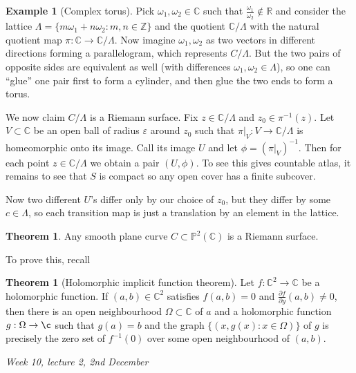 \documentclass{article}
\newcommand{\Z}{\mathbb{Z}}
\newcommand{\R}{\mathbb{R}}
\newcommand{\C}{\mathbb{C}}
\newcommand{\p}{\mathbb{P}}
\theoremstyle{definition}
\newtheorem{thm}[defn]{Theorem}
\newtheorem{example}[defn]{Example}
\begin{document}
\begin{example}[Complex torus]
Pick $\omega_1,\omega_2\in\C$ such that $\frac{\omega_1}{\omega_2}\notin\R$ and consider the lattice $\Lambda=\{m\omega_1+n\omega_2:m,n\in\Z\}$ and the quotient $\C/\Lambda$ with the natural quotient map $\pi:\C\rightarrow\C/\Lambda$. Now imagine $\omega_1,\omega_2$ as two vectors in different directions forming a parallelogram, which represents $C/\Lambda$. But the two pairs of opposite sides are equivalent as well (with differences $\omega_1,\omega_2\in\Lambda$), so one can ``glue'' one pair first to form a cylinder, and then glue the two ends to form a torus.

We now claim $C/\Lambda$ is a Riemann surface. Fix $z\in\C/\Lambda$ and $z_0\in\pi^{-1}(z)$. Let $V\subset\C$ be an open ball of radius $\varepsilon$ around $z_0$ such that $\left.\pi\right|_{V}:V\rightarrow\C/\Lambda$ is homeomorphic onto its image. Call its image $U$ and let $\phi=\left(\left.\pi\right|_V\right)^{-1}$. Then for each point $z\in\C/\Lambda$ we obtain a pair $(U,\phi)$. To see this gives countable atlas, it remains to see that $S$ is compact so any open cover has a finite subcover.

Now two different $U$'s differ only by our choice of $z_0$, but they differ by some $c\in\Lambda$, so each transition map is just a translation by an element in the lattice.
\end{example}

\begin{thm}
\label{thm:smoothcurvesareRiemsurf}
Any smooth plane curve $C\subset\p^2(\C)$ is a Riemann surface.
\end{thm}

To prove this, recall
\begin{thm}[Holomorphic implicit function theorem]
Let $f:\C^2\rightarrow\C$ be a holomorphic function. If $(a,b)\in\C^2$ satisfies $f(a,b)=0$ and $\frac{\partial f}{\partial y}(a,b)\neq 0$, then there is an open neighbourhood $\Omega\subset\C$ of $a$ and a holomorphic function $g:\Omega\rightarrow\c$ such that $g(a)=b$ and the graph $\{(x,g(x):x\in\Omega)\}$ of $g$ is precisely the zero set of $f^{-1}(0)$ over some open neighbourhood of $(a,b)$.
\end{thm}

\begin{flushright}
\textit{Week 10, lecture 2, 2nd December}
\end{flushright}
\end{document}
